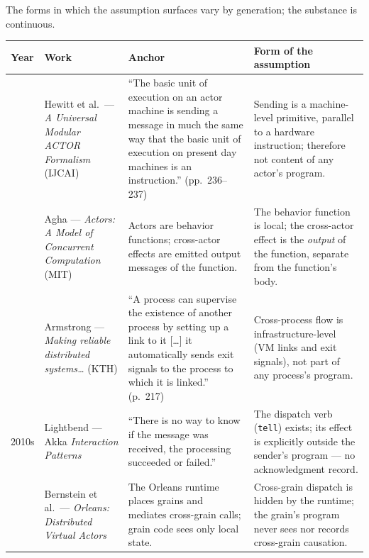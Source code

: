 \documentclass[
]{article}
\newcounter{none} %
\let\origtexttt\texttt%
\renewcommand{\texttt}[1]{\origtexttt{\seqsplit{#1}}}%
\let\texttt\origtexttt%
\begin{document}
The forms in which the assumption surfaces vary by generation; the
substance is continuous.

{\def\LTcaptype{none} %
\begin{longtable}[]{@{}
  >{\raggedright\arraybackslash}p{}
  >{\raggedright\arraybackslash}p{}
  >{\raggedright\arraybackslash}p{}
  >{\raggedright\arraybackslash}p{}@{}}
\toprule\noalign{}
\begin{minipage}[b]{\linewidth}\raggedright
Year
\end{minipage} & \begin{minipage}[b]{\linewidth}\raggedright
Work
\end{minipage} & \begin{minipage}[b]{\linewidth}\raggedright
Anchor
\end{minipage} & \begin{minipage}[b]{\linewidth}\raggedright
Form of the assumption
\end{minipage} \\
\midrule\noalign{}
\endhead
\bottomrule\noalign{}
\endlastfoot
1973 & Hewitt et al.~--- \emph{A Universal Modular ACTOR Formalism}
(IJCAI) & ``The basic unit of execution on an actor machine is sending a
message in much the same way that the basic unit of execution on present
day machines is an instruction.'' (pp.~236--237) & Sending is a
machine-level primitive, parallel to a hardware instruction; therefore
not content of any actor's program. \\
1986 & Agha --- \emph{Actors: A Model of Concurrent Computation} (MIT) &
Actors are behavior functions; cross-actor effects are emitted output
messages of the function. & The behavior function is local; the
cross-actor effect is the \emph{output} of the function, separate from
the function's body. \\
2003 & Armstrong --- \emph{Making reliable distributed systems\ldots{}}
(KTH) & ``A process can supervise the existence of another process by
setting up a link to it {[}\ldots{]} it automatically sends exit signals
to the process to which it is linked.'' (p.~217) & Cross-process flow is
infrastructure-level (VM links and exit signals), not part of any
process's program. \\
2010s & Lightbend --- Akka \emph{Interaction Patterns} & ``There is no
way to know if the message was received, the processing succeeded or
failed.'' & The dispatch verb (\texttt{tell}) exists; its effect is
explicitly outside the sender's program --- no acknowledgment record. \\
2014 & Bernstein et al.~--- \emph{Orleans: Distributed Virtual Actors} &
The Orleans runtime places grains and mediates cross-grain calls; grain
code sees only local state. & Cross-grain dispatch is hidden by the
runtime; the grain's program never sees nor records cross-grain
causation. \\
\end{longtable}
}
\end{document}
